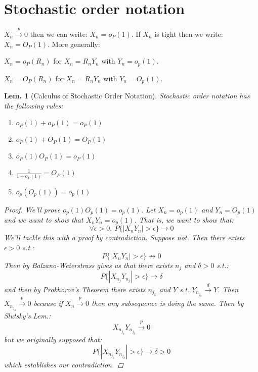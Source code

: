 \documentclass{tufte-book}
\theoremstyle{mytheoremstyle}
\theoremstyle{mylemstyle}
\newtheorem*{lem}{Lem.}
\theoremstyle{mydefstyle}
\begin{document}
\section{Stochastic order notation}
 \(X_n \overset{p}{\rightarrow} 0\) then we can write: \(X_n = o_P(1)\). If \(X_n\) is tight then we write: \(X_n = O_P(1)\). More generally:
	\begin{description}
		\item \(X_n = o_P(R_n) \) for \(X_n = R_n Y_n\) with \(Y_n = o_p(1)\).
		\item \(X_n = O_P(R_n) \) for \(X_n = R_n Y_n\) with \(Y_n = O_p(1)\).
	\end{description}
\begin{lem}[Calculus of Stochastic Order Notation] Stochastic order notation has the following rules:
	\begin{enumerate}
		\item \(o_P(1) + o_P(1) = o_P(1)\)
		\item \(o_P(1) + O_P(1) = O_P(1)\)
		\item \(o_P(1)O_P(1) = o_P(1)\)
		\item \(\frac{1}{1 + o_P(1)} = O_P(1) \)
		\item \(o_p(O_p(1)) = o_p(1)\)
	\end{enumerate}
	\begin{proof} We'll prove \(o_p(1)O_p(1) = o_p(1)\). Let \(X_n = o_p(1)\) and \(Y_n = O_p(1)\) and we want to show that \(X_nY_n = o_p(1)\). That is, we want to show that:
			\[\forall \epsilon > 0,\ P\{|X_n Y_n| > \epsilon \} \rightarrow 0\]
		We'll tackle this with a proof by contradiction. Suppose not. Then there exists \(\epsilon > 0\) s.t.:
			\[P\{|X_n Y_n| > \epsilon \} \not \rightarrow 0\]
		Then by Balzano-Weierstrass gives us that there exists \(n_j\) and \(\delta > 0\) s.t.:
			\[P\{|X_{n_j}Y_{n_j}| > \epsilon \} \rightarrow \delta \]
		and then by Prokhorov's Theorem there exists \(n_{j_k}\) and \(Y\) s.t. \(Y_{n_{j_k}} \overset{d}{\rightarrow} Y\). Then \(X_{n_{j_k}} \overset{p}{\rightarrow} 0\) because if \(X_n \overset{p}{\rightarrow} 0\) then any subsequence is doing the same. Then by Slutsky's Lem.:
			\[X_{n_{j_k}}Y_{n_{j_k}} \overset{p}{\rightarrow} 0\]
		but we originally supposed that:
			\[P\{|X_{n_{j_k}}Y_{n_{j_k}}| > \epsilon\} \rightarrow \delta > 0\]
		which establishes our contradiction. 
		\renewcommand{\qedsymbol}{{\(\Rightarrow \Leftarrow\)}}
	\end{proof}
\end{lem}
\end{document}
